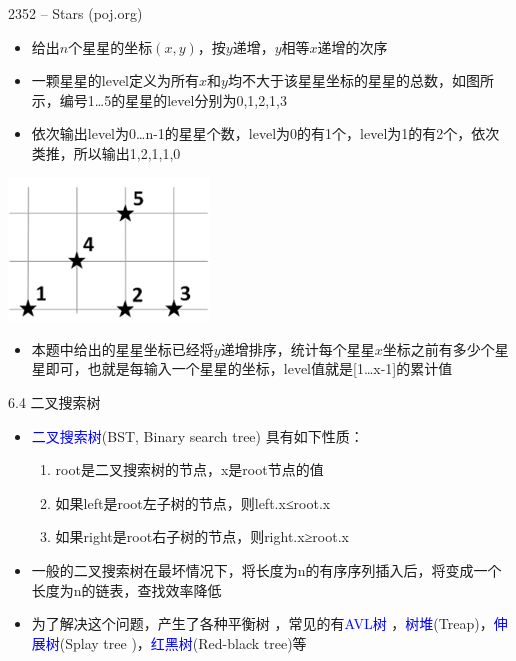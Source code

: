 \begin{frame}{2352 -- Stars (poj.org)}
    \begin{itemize}
        \item  给出$n$个星星的坐标$(x,y)$，按$y$递增，$y$相等$x$递增的次序
        \item 一颗星星的level定义为所有$x$和$y$均不大于该星星坐标的星星的总数，如图所示，编号1…5的星星的level分别为0,1,2,1,3
        \item 依次输出level为0…n-1的星星个数，level为0的有1个，level为1的有2个，依次类推，所以输出1,2,1,1,0
    \end{itemize}
    \includegraphics[width=0.4\textwidth,center]{fig/6-6.png}
    \begin{itemize}
        \item  本题中给出的星星坐标已经将$y$递增排序，统计每个星星$x$坐标之前有多少个星星即可，也就是每输入一个星星的坐标，level值就是[1…x-1]的累计值
    \end{itemize}
\end{frame}
\begin{frame}{6.4 二叉搜索树}
    \begin{itemize}
        \item  \textcolor{blue}{二叉搜索树}(BST, Binary search tree) 具有如下性质：
        \begin{enumerate}[(1)]
            \item root是二叉搜索树的节点，x是root节点的值
            \item 如果left是root左子树的节点，则left.x≤root.x
            \item 如果right是root右子树的节点，则right.x≥root.x
        \end{enumerate}
        \vfill
        \item 一般的二叉搜索树在最坏情况下，将长度为n的有序序列插入后，将变成一个长度为n的链表，查找效率降低
        \vfill
        \item 为了解决这个问题，产生了各种平衡树 ，常见的有\textcolor{blue}{AVL树} ，\textcolor{blue}{树堆}(Treap)，\textcolor{blue}{伸展树}(Splay tree )，\textcolor{blue}{红黑树}(Red-black tree)等
    \end{itemize}
\end{frame}
